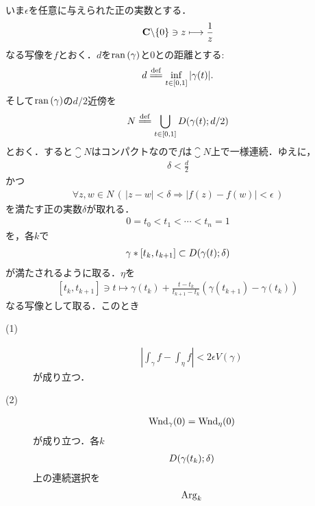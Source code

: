 	\begin{sketch}
		いま$\epsilon$を任意に与えられた正の実数とする．
		\begin{align}
			\mathbf{C} \backslash \{0\} \ni z \longmapsto \frac{1}{z}
		\end{align}
		なる写像を$f$とおく．$d$を$\operatorname*{ran} \left(\gamma\right)$と$0$との距離とする:
		\begin{align}
			d \defeq \inf{t \in [0,1]}{|\gamma(t)|}.
		\end{align}
		そして$\operatorname*{ran} \left(\gamma\right)$の$d/2$近傍を
		\begin{align}
			N \defeq \bigcup_{t \in [0,1]} \disc{\gamma(t)}{d/2}
		\end{align}
		とおく．すると$\closure{N}$はコンパクトなので$f$は$\closure{N}$上で一様連続．ゆえに，
		\begin{align}
			\delta < \frac{d}{2}
		\end{align}
		かつ
		\begin{align}
			\forall z,w \in N\, 
			\left(\, |z-w| < \delta \Longrightarrow |f(z) - f(w)| < \epsilon\, \right)
		\end{align}
		を満たす正の実数$\delta$が取れる．
		\begin{align}
			0 = t_0 < t_1 < \cdots < t_n = 1
		\end{align}
		を，各$k$で
		\begin{align}
			\gamma \ast \left[t_k,t_{k+1}\right] \subset D(\gamma(t);\delta)
		\end{align}
		が満たされるように取る．$\eta$を
		\begin{align}
			\left[t_k,t_{k+1}\right] \ni t \longmapsto \gamma(t_k) + \frac{t - t_k}{t_{k+1} - t_k} \left(\gamma(t_{k+1}) - \gamma(t_k)\right)
		\end{align}
		なる写像として取る．このとき
		\begin{description}
			\item[(1)]
				\begin{align}
					\left|\int_{\gamma} f  - \int_{\eta} f\right| < 2 \epsilon V(\gamma)
				\end{align}
				が成り立つ．
			\item[(2)]
				\begin{align}
					\operatorname{Wnd}_{\gamma}(0) = \operatorname{Wnd}_{\eta}(0)
				\end{align}
				が成り立つ．各$k$
				\begin{align}
					D(\gamma(t_k);\delta)
				\end{align}
				上の連続選択を
				\begin{align}
					\pvarg_k

\end{align}
\end{description}
\end{sketch}
